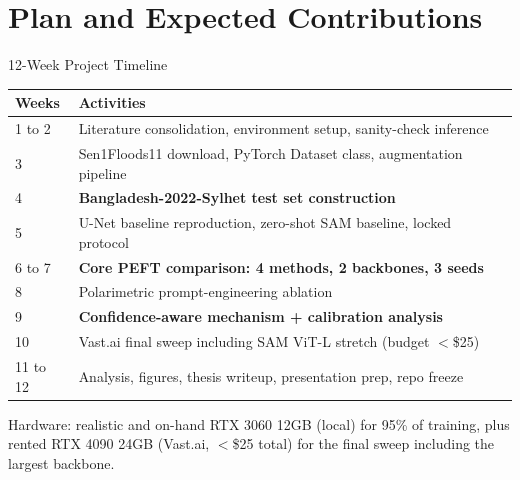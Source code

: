 \documentclass[10pt,aspectratio=169]{beamer}
\begin{document}
\section{Plan and Expected Contributions}

\begin{frame}{12-Week Project Timeline}
\renewcommand{\arraystretch}{1.2}
\begin{tabularx}{\textwidth}{p{1.4cm} X}
\toprule
\textbf{Weeks} & \textbf{Activities} \\
\midrule
1 to 2 & Literature consolidation, environment setup, sanity-check inference \\
3 & Sen1Floods11 download, PyTorch Dataset class, augmentation pipeline \\
4 & \textbf{Bangladesh-2022-Sylhet test set construction} \\
5 & U-Net baseline reproduction, zero-shot SAM baseline, locked protocol \\
6 to 7 & \textbf{Core PEFT comparison: 4 methods, 2 backbones, 3 seeds} \\
8 & Polarimetric prompt-engineering ablation \\
9 & \textbf{Confidence-aware mechanism + calibration analysis} \\
10 & Vast.ai final sweep including SAM ViT-L stretch (budget $<$\$25) \\
11 to 12 & Analysis, figures, thesis writeup, presentation prep, repo freeze \\
\bottomrule
\end{tabularx}

\vspace{0.5em}
\begin{block}{Hardware: realistic and on-hand}
RTX 3060 12GB (local) for 95\% of training, plus rented RTX 4090 24GB (Vast.ai, $<$\$25 total) for the final sweep including the largest backbone.
\end{block}
\end{frame}
\end{document}
